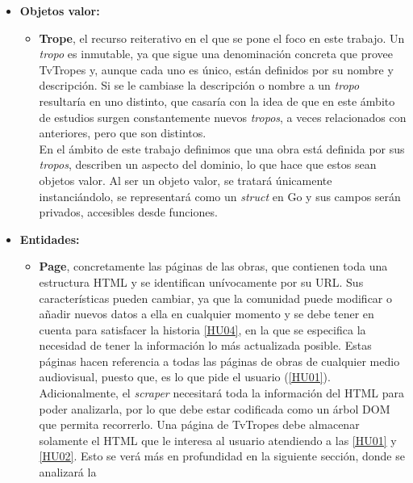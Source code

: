\begin{itemize}
  \item \textbf{Objetos valor:}
  \begin{itemize}
    \item \textbf{Trope}, el recurso reiterativo en el que se pone el foco en
    este trabajo. Un \textit{tropo} es inmutable, ya que sigue una denominación
    concreta que provee TvTropes y, aunque cada uno es único, están definidos
    por su nombre y descripción. Si se le cambiase la descripción o nombre a un
    \textit{tropo} resultaría en uno distinto, que casaría con la idea de que en
    este ámbito de estudios surgen constantemente nuevos \textit{tropos}, a
    veces relacionados con anteriores, pero que son distintos.\\
    En el ámbito de este trabajo definimos que una obra está definida por sus
    \textit{tropos}, describen un aspecto del dominio, lo que hace que estos
    sean objetos valor. Al ser un objeto valor, se tratará únicamente
    instanciándolo, se representará como un \textit{struct} en Go y sus campos
    serán privados, accesibles desde funciones. 
  \end{itemize}
  \item \textbf{Entidades:}
  \begin{itemize}
    \item
    \textbf{Page}, concretamente las páginas de las obras, que contienen toda
    una estructura HTML y se identifican unívocamente por su URL. Sus
    características pueden cambiar, ya que la comunidad puede modificar o añadir
    nuevos datos a ella en cualquier momento y se debe tener en cuenta para
    satisfacer la historia
    \href{https://github.com/jlgallego99/TropesToGo/issues/9}{[HU04]}, en la que
    se especifica la necesidad de tener la información lo más actualizada
    posible. Estas páginas hacen referencia a todas las páginas de obras de
    cualquier medio audiovisual, puesto que, es lo que pide el usuario
    (\href{https://github.com/jlgallego99/TropesToGo/issues/6}{[HU01]}).
    Adicionalmente, el \textit{scraper} necesitará toda la información del HTML
    para poder analizarla, por lo que debe estar codificada como un árbol DOM
    que permita recorrerlo. Una página de TvTropes debe almacenar solamente el
    HTML que le interesa al usuario atendiendo a las
    \href{https://github.com/jlgallego99/TropesToGo/issues/6}{[HU01]} y
    \href{https://github.com/jlgallego99/TropesToGo/issues/7}{[HU02]}. Esto se
    verá más en profundidad en la siguiente sección, donde se analizará la

\end{itemize}
\end{itemize}
